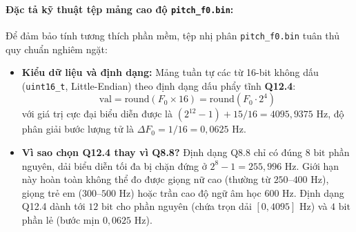 \documentclass[11pt,a4paper]{article}
\begin{document}
\paragraph{Đặc tả kỹ thuật tệp mảng cao độ \texttt{pitch\_f0.bin}:}
Để đảm bảo tính tương thích phần mềm, tệp nhị phân \texttt{pitch\_f0.bin} tuân thủ quy chuẩn nghiêm ngặt:
\begin{itemize}
    \setlength{\itemsep}{0.5pt}
    \item \textbf{Kiểu dữ liệu và định dạng:} Mảng tuần tự các từ 16-bit không dấu (\texttt{uint16\_t}, Little-Endian) theo định dạng dấu phẩy tĩnh \textbf{Q12.4}:
    \begin{equation}
    \text{val} = \text{round}(F_0 \times 16) = \text{round}(F_0 \cdot 2^4)
    \label{eq:q12_4_def}
    \end{equation}
    với giá trị cực đại biểu diễn được là $(2^{12} - 1) + 15/16 = 4095{,}9375\text{ Hz}$, độ phân giải bước lượng tử là $\Delta F_0 = 1/16 = 0{,}0625\text{ Hz}$.
    \item \textbf{Vì sao chọn Q12.4 thay vì Q8.8?} Định dạng Q8.8 chỉ có đúng $8\text{ bit}$ phần nguyên, dải biểu diễn tối đa bị chặn đứng ở $2^8 - 1 = 255{,}996\text{ Hz}$. Giới hạn này hoàn toàn không thể đo được giọng nữ cao (thường từ $250\text{--}400\text{ Hz}$), giọng trẻ em ($300\text{--}500\text{ Hz}$) hoặc trần cao độ ngữ âm học $600\text{ Hz}$. Định dạng Q12.4 dành tới $12\text{ bit}$ cho phần nguyên (chứa trọn dải $[0, 4095]\text{ Hz}$) và $4\text{ bit}$ phần lẻ (bước mịn $0{,}0625\text{ Hz}$).
    

\end{itemize}
\end{document}
